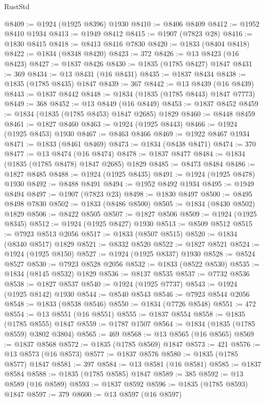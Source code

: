 \begin{lexlean}{RustStd}
\begin{coremodule}
{\begin{coremodule}
{{{{{@8409 := @1924 (@1925 @8396) @1930
@8410 := @8406 @8409
@8412 := @1952 @8410 @1934
@8413 := @1949 @8412
@8415 := @1907 (@7823 @28)
@8416 := @1830 @8415
@8418 := @8413 @8416 @7830
@8420 := @1833 (@8404 @8418)
@8422 := @1834 (@8348 @8420)
@8423 := 372
@8426 := @13 @8423 (@16 @8423)
@8427 := @1837 @8426
@8430 := @1835 (@1785 @8427) @1847
@8431 := 369
@8434 := @13 @8431 (@16 @8431)
@8435 := @1837 @8434
@8438 := @1835 (@1785 @8435) @1847
@8439 := 367
@8442 := @13 @8439 (@16 @8439)
@8443 := @1837 @8442
@8448 := @1834 (@1835 (@1785 @8443) @1847 @7773)
@8449 := 368
@8452 := @13 @8449 (@16 @8449)
@8453 := @1837 @8452
@8459 := @1834 (@1835 (@1785 @8453) @1847 @2685) @1829
@8460 := @8448 @8459
@8461 := @1827 @8460
@8463 := @1924 (@1925 @8443)
@8466 := @1924 (@1925 @8453) @1930
@8467 := @8463 @8466
@8469 := @1922 @8467 @1934
@8471 := @1833 (@8461 @8469)
@8473 := @1834 (@8438 @8471)
@8474 := 370
@8477 := @13 @8474 (@16 @8474)
@8478 := @1837 @8477
@8484 := @1834 (@1835 (@1785 @8478) @1847 @2685) @1829
@8485 := @8473 @8484
@8486 := @1827 @8485
@8488 := @1924 (@1925 @8435)
@8491 := @1924 (@1925 @8478) @1930
@8492 := @8488 @8491
@8494 := @1952 @8492 @1934
@8495 := @1949 @8494
@8497 := @1907 (@7823 @23)
@8498 := @1830 @8497
@8500 := @8495 @8498 @7830
@8502 := @1833 (@8486 @8500)
@8505 := @1834 (@8430 @8502) @1829
@8506 := @8422 @8505
@8507 := @1827 @8506
@8509 := @1924 (@1925 @8345)
@8512 := @1924 (@1925 @8427) @1930
@8513 := @8509 @8512
@8515 := @7923 @8513 @2056
@8517 := @1833 (@8507 @8515)
@8520 := @1834 (@8340 @8517) @1829
@8521 := @8332 @8520
@8522 := @1827 @8521
@8524 := @1924 (@1925 @8150)
@8527 := @1924 (@1925 @8337) @1930
@8528 := @8524 @8527
@8530 := @7923 @8528 @2056
@8532 := @1833 (@8522 @8530)
@8535 := @1834 (@8145 @8532) @1829
@8536 := @8137 @8535
@8537 := @7732 @8536
@8538 := @1827 @8537
@8540 := @1924 (@1925 @7737)
@8543 := @1924 (@1925 @8142) @1930
@8544 := @8540 @8543
@8546 := @7923 @8544 @2056
@8548 := @1833 (@8538 @8546)
@8550 := @1834 (@7726 @8548)
@8551 := 472
@8554 := @13 @8551 (@16 @8551)
@8555 := @1837 @8554
@8558 := @1835 (@1785 @8555) @1847
@8559 := @1787 @1507
@8564 := @1834 (@1835 (@1785 @8559) @3802 @3804)
@8565 := 469
@8568 := @13 @8565 (@16 @8565)
@8569 := @1837 @8568
@8572 := @1835 (@1785 @8569) @1847
@8573 := 421
@8576 := @13 @8573 (@16 @8573)
@8577 := @1837 @8576
@8580 := @1835 (@1785 @8577) @1847
@8581 := 397
@8584 := @13 @8581 (@16 @8581)
@8585 := @1837 @8584
@8588 := @1835 (@1785 @8585) @1847
@8589 := 385
@8592 := @13 @8589 (@16 @8589)
@8593 := @1837 @8592
@8596 := @1835 (@1785 @8593) @1847
@8597 := 379
@8600 := @13 @8597 (@16 @8597)
}}}}}
\end{coremodule}}
\end{coremodule}
\end{lexlean}
